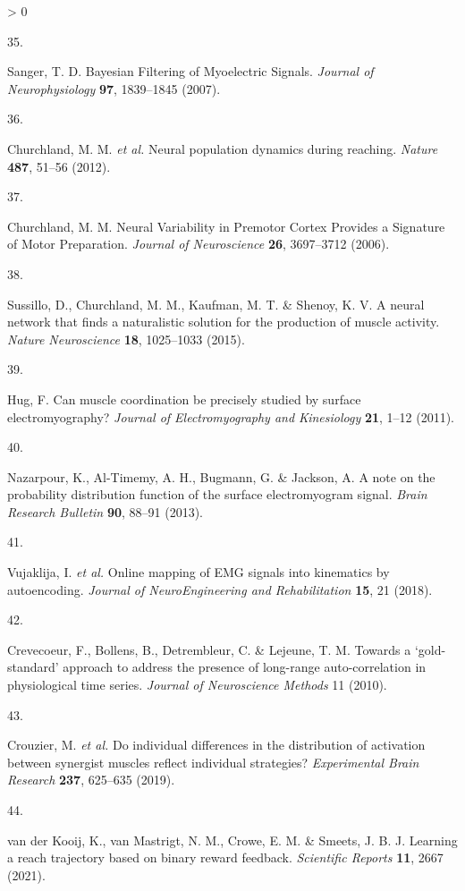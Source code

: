 \documentclass[
  a4paper,
]{article}
\newlength{\cslhangindent}
\newlength{\csllabelwidth}
\newenvironment{CSLReferences}[2] %
 {%
  \setlength{\parindent}{0pt}
  \ifodd #1 \everypar{\setlength{\hangindent}{\cslhangindent}}\ignorespaces\fi
  \ifnum #2 > 0
  \setlength{\parskip}{#2\baselineskip}
  \fi
 }%
 {}
\newcommand{\CSLLeftMargin}[1]{\parbox[t]{\csllabelwidth}{#1}}
\newcommand{\CSLRightInline}[1]{\parbox[t]{\linewidth - \csllabelwidth}{#1}\break}
\begin{document}
\begin{CSLReferences}{0}{0}
\leavevmode\hypertarget{ref-sangerBayesianFilteringMyoelectric2007}{}%
\CSLLeftMargin{35. }
\CSLRightInline{Sanger, T. D. Bayesian {Filtering} of {Myoelectric
Signals}. \emph{Journal of Neurophysiology} \textbf{97}, 1839--1845
(2007).}

\leavevmode\hypertarget{ref-churchlandNeuralPopulationDynamics2012a}{}%
\CSLLeftMargin{36. }
\CSLRightInline{Churchland, M. M. \emph{et al.} Neural population
dynamics during reaching. \emph{Nature} \textbf{487}, 51--56 (2012).}

\leavevmode\hypertarget{ref-churchlandNeuralVariabilityPremotor2006}{}%
\CSLLeftMargin{37. }
\CSLRightInline{Churchland, M. M. Neural {Variability} in {Premotor
Cortex Provides} a {Signature} of {Motor Preparation}. \emph{Journal of
Neuroscience} \textbf{26}, 3697--3712 (2006).}

\leavevmode\hypertarget{ref-sussillo2015}{}%
\CSLLeftMargin{38. }
\CSLRightInline{Sussillo, D., Churchland, M. M., Kaufman, M. T. \&
Shenoy, K. V. A neural network that finds a naturalistic solution for
the production of muscle activity. \emph{Nature Neuroscience}
\textbf{18}, 1025--1033 (2015).}

\leavevmode\hypertarget{ref-Hug2011}{}%
\CSLLeftMargin{39. }
\CSLRightInline{Hug, F. Can muscle coordination be precisely studied by
surface electromyography? \emph{Journal of Electromyography and
Kinesiology} \textbf{21}, 1--12 (2011).}

\leavevmode\hypertarget{ref-nazarpourNoteProbabilityDistribution2013}{}%
\CSLLeftMargin{40. }
\CSLRightInline{Nazarpour, K., Al-Timemy, A. H., Bugmann, G. \& Jackson,
A. A note on the probability distribution function of the surface
electromyogram signal. \emph{Brain Research Bulletin} \textbf{90},
88--91 (2013).}

\leavevmode\hypertarget{ref-vujaklijaOnlineMappingEMG2018}{}%
\CSLLeftMargin{41. }
\CSLRightInline{Vujaklija, I. \emph{et al.} Online mapping of {EMG}
signals into kinematics by autoencoding. \emph{Journal of
NeuroEngineering and Rehabilitation} \textbf{15}, 21 (2018).}

\leavevmode\hypertarget{ref-crevecoeurGoldstandardApproachAddress2010}{}%
\CSLLeftMargin{42. }
\CSLRightInline{Crevecoeur, F., Bollens, B., Detrembleur, C. \& Lejeune,
T. M. Towards a {`gold-standard'} approach to address the presence of
long-range auto-correlation in physiological time series. \emph{Journal
of Neuroscience Methods} 11 (2010).}

\leavevmode\hypertarget{ref-crouzierIndividualDifferencesDistribution2019}{}%
\CSLLeftMargin{43. }
\CSLRightInline{Crouzier, M. \emph{et al.} Do individual differences in
the distribution of activation between synergist muscles reflect
individual strategies? \emph{Experimental Brain Research} \textbf{237},
625--635 (2019).}

\leavevmode\hypertarget{ref-vanderkooijLearningReachTrajectory2021}{}%
\CSLLeftMargin{44. }
\CSLRightInline{van der Kooij, K., van Mastrigt, N. M., Crowe, E. M. \&
Smeets, J. B. J. Learning a reach trajectory based on binary reward
feedback. \emph{Scientific Reports} \textbf{11}, 2667 (2021).}

\end{CSLReferences}
\end{document}
